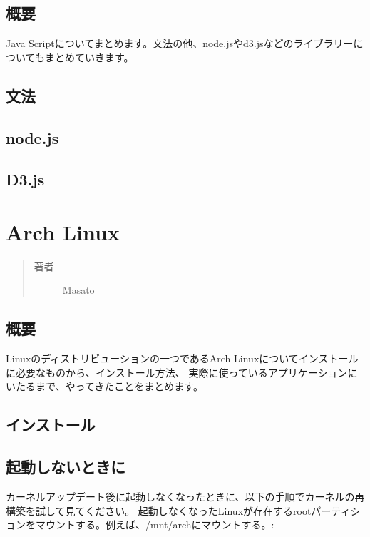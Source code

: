 \documentclass[letterpaper,10pt,dvipdfmx]{sphinxmanual}
\begin{document}
\section{概要}
\label{learned_programing_js:id1}
Java Scriptについてまとめます。文法の他、node.jsやd3.jsなどのライブラリーについてもまとめていきます。


\section{文法}
\label{learned_programing_js:id2}

\section{node.js}
\label{learned_programing_js:node-js}

\section{D3.js}
\label{learned_programing_js:d3-js}

\chapter{Arch Linux}
\label{learned_linux_archlinux:arch-linux}\label{learned_linux_archlinux::doc}\begin{quote}\begin{description}
\item[{著者}] \leavevmode
Masato

\end{description}\end{quote}


\section{概要}
\label{learned_linux_archlinux:id1}
Linuxのディストリビューションの一つであるArch Linuxについてインストールに必要なものから、インストール方法、
実際に使っているアプリケーションにいたるまで、やってきたことをまとめます。


\section{インストール}
\label{learned_linux_archlinux:id2}

\section{起動しないときに}
\label{learned_linux_archlinux:id3}
カーネルアップデート後に起動しなくなったときに、以下の手順でカーネルの再構築を試して見てください。
起動しなくなったLinuxが存在するrootパーティションをマウントする。例えば、/mnt/archにマウントする。:
\end{document}
